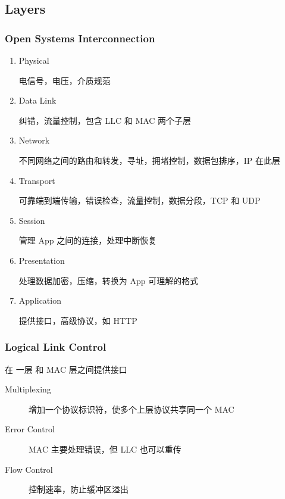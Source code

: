 \documentclass[11pt,journal,compsoc]{IEEEtran}
\begin{document}
\subsection{Layers}


\subsubsection{Open Systems Interconnection}

\begin{enumerate}
    \item Physical

    电信号，电压，介质规范
    
    \item Data Link

    纠错，流量控制，包含 LLC 和 MAC 两个子层

    \item Network

    不同网络之间的路由和转发，寻址，拥堵控制，数据包排序，IP 在此层

    \item Transport

    可靠端到端传输，错误检查，流量控制，数据分段，TCP 和 UDP

    \item Session

    管理 App 之间的连接，处理中断恢复

    \item Presentation

    处理数据加密，压缩，转换为 App 可理解的格式

    \item Application

    提供接口，高级协议，如 HTTP
\end{enumerate}


\subsubsection{Logical Link Control}

在 一层 和 MAC 层之间提供接口

\begin{description}
    \item[Multiplexing] 增加一个协议标识符，使多个上层协议共享同一个 MAC

    \item[Error Control] MAC 主要处理错误，但 LLC 也可以重传

    \item[Flow Control] 控制速率，防止缓冲区溢出
\end{description}
\end{document}
